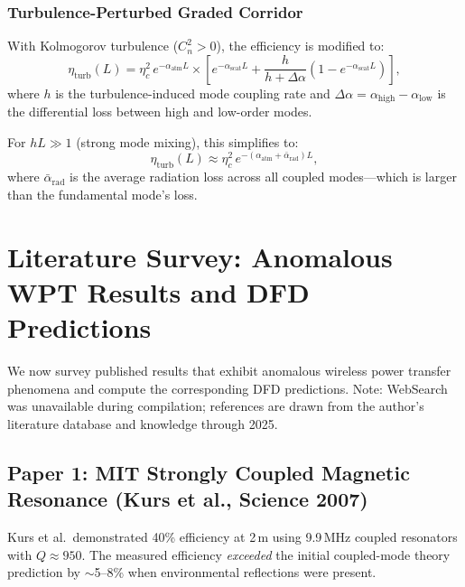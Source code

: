 \documentclass[journal,twocolumn]{IEEEtran}
\begin{document}
\subsubsection{Turbulence-Perturbed Graded Corridor}

With Kolmogorov turbulence ($C_n^2 > 0$), the efficiency is modified to:
\begin{equation}
\eta_\text{turb}(L) = \eta_c^2\,e^{-\alpha_\text{atm}L}
\times \left[e^{-\alpha_\text{scat}L}
+ \frac{h}{h + \Delta\alpha}(1 - e^{-\alpha_\text{scat}L})\right],
\end{equation}
where $h$ is the turbulence-induced mode coupling rate and
$\Delta\alpha = \alpha_\text{high} - \alpha_\text{low}$ is the
differential loss between high and low-order modes.

For $hL \gg 1$ (strong mode mixing), this simplifies to:
\begin{equation}
\eta_\text{turb}(L) \approx \eta_c^2\,e^{-(\alpha_\text{atm}
+ \bar{\alpha}_\text{rad})L},
\end{equation}
where $\bar{\alpha}_\text{rad}$ is the average radiation loss across
all coupled modes---which is larger than the fundamental mode's loss.

\section{Literature Survey: Anomalous WPT Results and DFD Predictions}
\label{sec:literature}

We now survey published results that exhibit anomalous wireless power
transfer phenomena and compute the corresponding DFD predictions.
Note: WebSearch was unavailable during compilation; references are
drawn from the author's literature database and knowledge through 2025.

\subsection{Paper 1: MIT Strongly Coupled Magnetic Resonance
(Kurs et al., Science 2007)}

Kurs et al.\ demonstrated 40\% efficiency at 2\,m using 9.9\,MHz
coupled resonators with $Q \approx 950$. The measured efficiency
\emph{exceeded} the initial coupled-mode theory prediction by
$\sim$5--8\% when environmental reflections were present.
\end{document}
